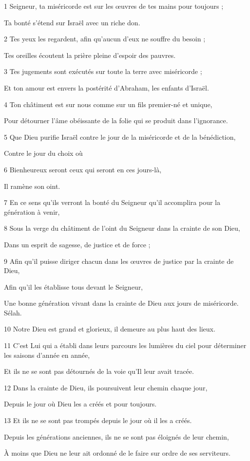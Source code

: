 \par 1 Seigneur, ta miséricorde est sur les œuvres de tes mains pour toujours ;
\par     Ta bonté s'étend sur Israël avec un riche don.
\par 2 Tes yeux les regardent, afin qu'aucun d'eux ne souffre du besoin ;
\par     Tes oreilles écoutent la prière pleine d’espoir des pauvres.
\par 3 Tes jugements sont exécutés sur toute la terre avec miséricorde ;
\par     Et ton amour est envers la postérité d’Abraham, les enfants d’Israël.
\par 4 Ton châtiment est sur nous comme sur un fils premier-né et unique,
\par     Pour détourner l'âme obéissante de la folie qui se produit dans l'ignorance.
\par 5 Que Dieu purifie Israël contre le jour de la miséricorde et de la bénédiction,
\par     Contre le jour du choix où
\par 6 Bienheureux seront ceux qui seront en ces jours-là,
\par     Il ramène son oint.
\par 7 En ce sens qu'ils verront la bonté du Seigneur qu'il accomplira pour la génération à venir,
\par 8 Sous la verge du châtiment de l'oint du Seigneur dans la crainte de son Dieu,
\par     Dans un esprit de sagesse, de justice et de force ;
\par 9 Afin qu'il puisse diriger chacun dans les œuvres de justice par la crainte de Dieu,
\par     Afin qu'il les établisse tous devant le Seigneur,
\par     Une bonne génération vivant dans la crainte de Dieu aux jours de miséricorde. Sélah.
\par   
\par 10 Notre Dieu est grand et glorieux, il demeure au plus haut des lieux.
\par 11 C'est Lui qui a établi dans leurs parcours les lumières du ciel pour déterminer les saisons d'année en année,
\par     Et ils ne se sont pas détournés de la voie qu’Il ​​leur avait tracée.
\par 12 Dans la crainte de Dieu, ils poursuivent leur chemin chaque jour,
\par     Depuis le jour où Dieu les a créés et pour toujours.
\par 13 Et ils ne se sont pas trompés depuis le jour où il les a créés.
\par     Depuis les générations anciennes, ils ne se sont pas éloignés de leur chemin,
\par     À moins que Dieu ne leur ait ordonné de le faire sur ordre de ses serviteurs.


